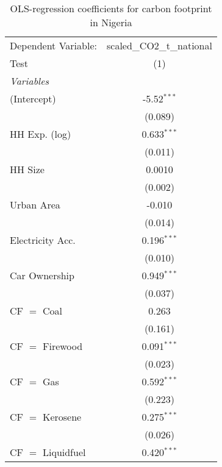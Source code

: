 
\begin{table}[htbp!]
   \centering
   \small
   \begin{adjustbox}{width = 1\textwidth, max height = 0.95\textheight, center}
      \begin{threeparttable}[b]
         \caption{\label{tab:OLS_2_NGA} OLS-regression coefficients for carbon footprint in Nigeria}
         \begin{tabular}{lc}
            \tabularnewline \midrule \midrule
            Dependent Variable: & scaled\_CO2\_t\_national\\     
            Test                & (1)\\  
            \midrule
            \emph{Variables}\\
            (Intercept)         & -5.52$^{***}$\\   
                                & (0.089)\\   
            HH Exp. (log)       & 0.633$^{***}$\\   
                                & (0.011)\\   
            HH Size             & 0.0010\\   
                                & (0.002)\\   
            Urban Area          & -0.010\\   
                                & (0.014)\\   
            Electricity Acc.    & 0.196$^{***}$\\   
                                & (0.010)\\   
            Car Ownership       & 0.949$^{***}$\\   
                                & (0.037)\\   
            CF $=$ Coal         & 0.263\\   
                                & (0.161)\\   
            CF $=$ Firewood     & 0.091$^{***}$\\   
                                & (0.023)\\   
            CF $=$ Gas          & 0.592$^{***}$\\   
                                & (0.223)\\   
            CF $=$ Kerosene     & 0.275$^{***}$\\   
                                & (0.026)\\   
            CF $=$ Liquidfuel   & 0.420$^{***}$\\   

\end{tabular}
\end{threeparttable}
\end{adjustbox}
\end{table}
